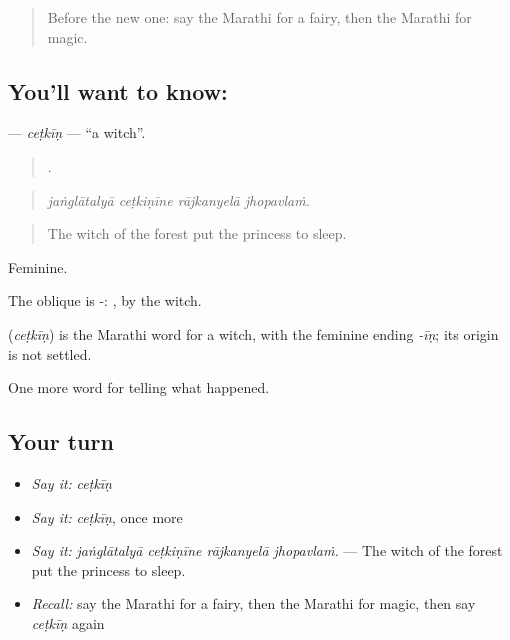 \label{lesson:MR-C338-cetkin}



\begin{quote}
Before the new one: say the Marathi for a fairy, then the Marathi for magic.
\end{quote}

\subsection*{You'll want to know: }
\textbf{} — \emph{ceṭkīṇ} — \textquotedblleft{}a witch\textquotedblright{}.

\begin{quote}
   .
\end{quote}

\begin{quote}
\emph{jaṅglātalyā ceṭkiṇīne rājkanyelā jhopavlaṁ.}
\end{quote}

\begin{quote}
The witch of the forest put the princess to sleep.
\end{quote}

Feminine.

The oblique is -: , by the witch.

\begin{cousinweb}
\textbf{} (\emph{ceṭkīṇ}) is the Marathi word for a witch, with the feminine ending \emph{-īṇ}; its origin is not settled.
\end{cousinweb}

\begin{grammarlens}[title={What you've built}]
One more word for telling what happened.
\end{grammarlens}

\subsection*{Your turn}
\begin{itemize}
\raggedright
  \item \emph{Say it:} \emph{ceṭkīṇ}
  \item \emph{Say it:} \emph{ceṭkīṇ}, once more
  \item \emph{Say it:} \emph{jaṅglātalyā ceṭkiṇīne rājkanyelā jhopavlaṁ.} — The witch of the forest put the princess to sleep.
  \item \emph{Recall:} say the Marathi for a fairy, then the Marathi for magic, then say \emph{ceṭkīṇ} again
\end{itemize}

